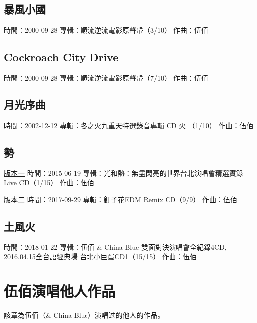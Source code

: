 \documentclass[UTF8,a4paper,oneside,twocolumn,12pt]{ctexbook}
\newcommand{\infopair}[2]{\textbullet #1：#2}
\newcommand{\zq}[1][伍佰]{\infopair{作曲}{#1}}
\newcommand{\zj}[1]{\infopair{專輯}{#1}}
\newcommand{\sj}[1]{\infopair{時間}{#1}}
\newenvironment{info}{\begin{flushleft}\kaishu
	}
	{\end{flushleft}\normalsize\yahei\par}
\begin{document}
\section{暴風小國}
\begin{info}
	\sj{2000-09-28}
	\zj{順流逆流電影原聲帶（3/10）}
	\zq
\end{info}

\section{Cockroach City Drive}
\begin{info}
	\sj{2000-09-28}
	\zj{順流逆流電影原聲帶（7/10）}
	\zq
\end{info}

\section{月光序曲}
\begin{info}
	\sj{2002-12-12}
	\zj{冬之火九重天特選錄音專輯 CD 火 （1/10）}
	\zq
\end{info}

\section{勢}
\begin{info}
	\underline{版本一}
	\sj{2015-06-19}
	\zj{光和熱：無盡閃亮的世界台北演唱會精選實錄Live CD（1/15）}
	\zq
\end{info}

\begin{info}
	\underline{版本二}
	\sj{2017-09-29}
	\zj{釘子花EDM Remix CD（9/9）}
	\zq
\end{info}

\section{土風火}
\begin{info}
	\sj{2018-01-22}
	\zj{伍佰 \& China Blue 雙面對決演唱會全紀錄4CD,
		2016.04.15全台語經典場 台北小巨蛋CD1（15/15）}
	\zq
\end{info}

\chapter{伍佰演唱他人作品}
該章為伍佰（\& China Blue）演唱过的他人的作品。
\end{document}
